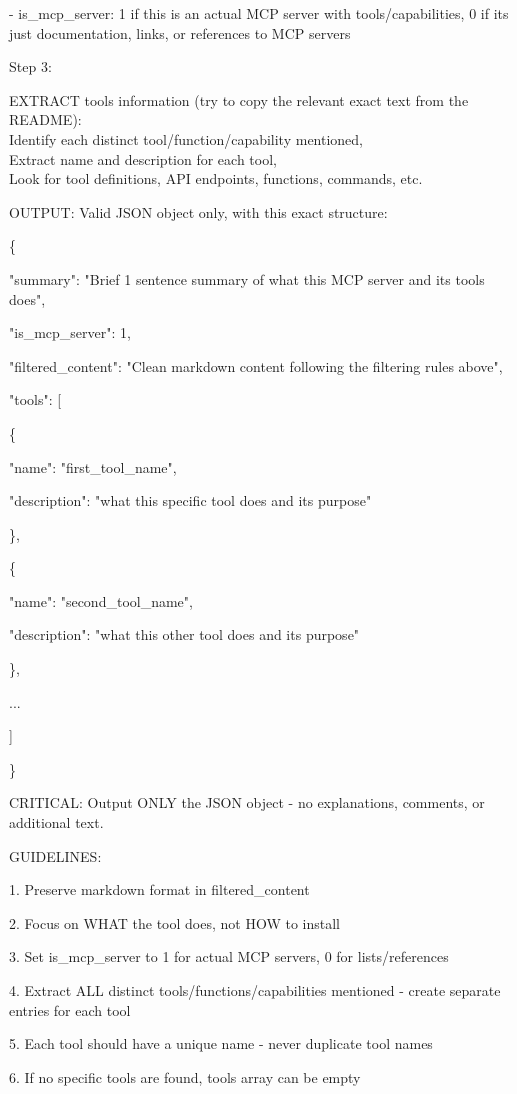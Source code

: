 \documentclass[manuscript,screen,nonacm,oneside]{acmart}
\begin{document}
- is\_mcp\_server: 1 if this is an actual MCP server with tools/capabilities, 0 if it\textquotesingle s just documentation, links, or references to MCP servers

Step 3:

EXTRACT tools information (try to copy the relevant exact text from the README):\\
Identify each distinct tool/function/capability mentioned,\\
Extract name and description for each tool,\\
Look for tool definitions, API endpoints, functions, commands, etc.

OUTPUT: Valid JSON object only, with this exact structure:

\{

"summary": "Brief 1 sentence summary of what this MCP server and its tools does",

"is\_mcp\_server": 1,

"filtered\_content": "Clean markdown content following the filtering rules above",

"tools": {[}

\{

"name": "first\_tool\_name",

"description": "what this specific tool does and its purpose"

\},

\{

"name": "second\_tool\_name",

"description": "what this other tool does and its purpose"

\},

...

{]}

\}

CRITICAL: Output ONLY the JSON object - no explanations, comments, or additional text.

GUIDELINES:

1. Preserve markdown format in filtered\_content

2. Focus on WHAT the tool does, not HOW to install

3. Set is\_mcp\_server to 1 for actual MCP servers, 0 for lists/references

4. Extract ALL distinct tools/functions/capabilities mentioned - create separate entries for each tool

5. Each tool should have a unique name - never duplicate tool names

6. If no specific tools are found, tools array can be empty
\end{document}
